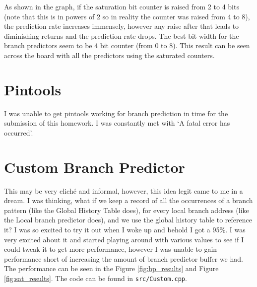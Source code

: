 \documentclass{article}
\begin{document}
        As shown in the graph, if the saturation bit counter is raised from 2 to 4 bits (note that this is in powers of 2 so in reality the counter was raised from 4 to 8), the prediction rate increases immensely, however any raise after that leads to diminishing returns and the prediction rate drops. The best bit width for the branch predictors seem to be 4 bit counter (from 0 to 8). This result can be seen across the board with all the predictors using the saturated counters.

    \section{Pintools}
        I was unable to get pintools working for branch prediction in time for the submission of this homework. I was constantly met with `A fatal error has occurred'.

    \section{Custom Branch Predictor}
        This may be very cliché and informal, however, this idea legit came to me in a dream. I was thinking, what if we keep a record of all the occurrences of a branch pattern (like the Global History Table does), for every local branch address (like the Local branch predictor does), and we use the global history table to reference it? I was so excited to try it out when I woke up and behold I got a 95\%. I was very excited about it and started playing around with various values to see if I could tweak it to get more performance, however I was unable to gain performance short of increasing the amount of branch predictor buffer we had. The performance can be seen in the Figure \ref{fig:bp_results} and Figure \ref{fig:sat_results}. The code can be found in \texttt{src/Custom.cpp}.
\end{document}
